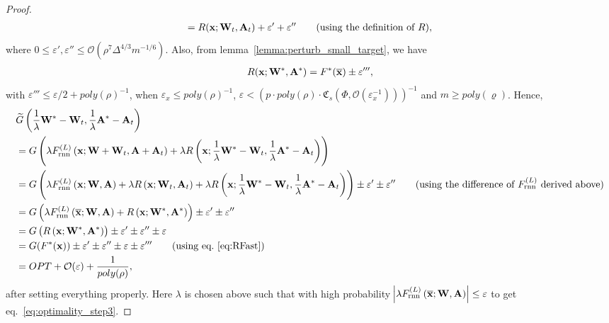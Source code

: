 \begin{proof}
\begin{align*}
		=  R(\mathbf{x}; \mathbf{W}_t, \mathbf{A}_t) + \varepsilon' + \varepsilon'' \tag{using the definition of $R$},
	\end{align*}
	where $0 \le \varepsilon', \varepsilon'' \le \mathcal{O}(\rho^7 \Delta^{4/3} m^{-1/6})$. Also, from lemma~\ref{lemma:perturb_small_target}, we have
	\begin{align*}
	    R(\mathbf{x}; \mathbf{W}^{\ast}, \mathbf{A}^{\ast}) = F^{\ast}(\overline{\mathbf{x}}) \pm \varepsilon''', \label{eq:RFast}
	\end{align*}
	with $\varepsilon''' \le \varepsilon/2 + poly(\rho)^{-1}$, when $\varepsilon_x \le poly(\rho)^{-1}$, $\varepsilon < (p \cdot poly(\rho) \cdot \mathfrak{C}_s(\Phi, \mathcal{O}(\varepsilon_x^{-1})))^{-1}$ and $m \ge poly(\varrho)$.
	Hence, 
	\begin{align}
		& \widetilde{G}\left(\frac{1}{\lambda} \mathbf{W}^{\ast} - \mathbf{W}_t, \frac{1}{\lambda}\mathbf{A}^{\ast} - \mathbf{A}_t\right) \nonumber\\&= G\left(\lambda F_{\mathrm{rnn}}^{(L)}\left(\bx;  \mathbf{W} + \mathbf{W}_t,  \mathbf{A} + \mathbf{A}_t\right) + \lambda  R\left(\bx; \frac{1}{\lambda} \mathbf{W}^{\ast} - \mathbf{W}_t, \frac{1}{\lambda}\mathbf{A}^{\ast} - \mathbf{A}_t \right)\right) \nonumber\\&
		= G\left(\lambda F_{\mathrm{rnn}}^{(L)}\left(\bx;  \mathbf{W},  \mathbf{A}\right) + \lambda R\left(\bx;  \mathbf{W}_t, \mathbf{A}_t \right) + \lambda  R\left(\bx; \frac{1}{\lambda} \mathbf{W}^{\ast} - \mathbf{W}_t, \frac{1}{\lambda}\mathbf{A}^{\ast} - \mathbf{A}_t \right)\right) \pm \varepsilon' \pm \varepsilon'' \tag{using the difference of  $F_{\mathrm{rnn}}^{(L)}$ derived above} \nonumber\\&
		=  G\left(\lambda F_{\mathrm{rnn}}^{(L)}\left(\obx;  \mathbf{W},  \mathbf{A}\right) +  R\left(\bx;  \mathbf{W}^{\ast}, \mathbf{A}^{\ast} \right)\right) \pm \varepsilon' \pm \varepsilon'' \nonumber\\&
		= G\left(R\left(\bx;  \mathbf{W}^{\ast}, \mathbf{A}^{\ast} \right)\right) \pm \varepsilon' \pm \varepsilon'' \pm \varepsilon \label{eq:optimality_step3}
		\\&= G(F^{\ast}(\bx)) \pm \varepsilon' \pm \varepsilon'' \pm \varepsilon \pm \varepsilon''' \tag{using eq.~\ref{eq:RFast}}\\&= OPT + \mathcal{O}(\varepsilon) + \frac{1}{poly(\rho)},\label{eq:optimality}
	\end{align}
	after setting everything properly. Here $\lambda$ is chosen above such that with high probability $\abs{\lambda F_{\mathrm{rnn}}^{(L)}\left(\overline{\mathbf{x}};  \mathbf{W},  \mathbf{A}\right)} \le \varepsilon$ to get eq.~\ref{eq:optimality_step3}.
	

\end{proof}

